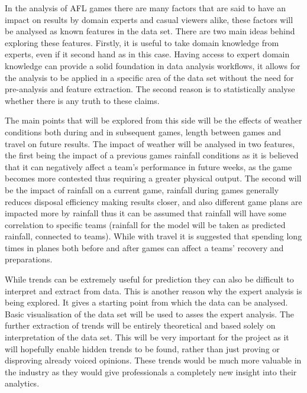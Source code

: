 \documentclass{imc-inf}
\begin{document}
	In the analysis of AFL games there are many factors that are said to have an impact on results by domain experts and casual viewers alike, these factors will be analysed as known features in the data set. There are two main ideas behind exploring these features. Firstly, it is useful to take domain knowledge from experts, even if it second hand as in this case. Having access to expert domain knowledge can provide a solid foundation in data analysis workflows, it allows for the analysis to be applied in a specific area of the data set without the need for pre-analysis and feature extraction. The second reason is to statistically analyse whether there is any truth to these claims. 
	
	The main points that will be explored from this side will be the effects of weather conditions both during and in subsequent games, length between games and travel on future results. The impact of weather will be analysed in two features, the first being the impact of a previous games rainfall conditions as it is believed that it can negatively affect a team’s performance in future weeks, as the game becomes more contested thus requiring a greater physical output. The second will be the impact of rainfall on a current game, rainfall during games generally reduces disposal efficiency making results closer, and also different game plans are impacted more by rainfall thus it can be assumed that rainfall will have some correlation to specific teams (rainfall for the model will be taken as predicted rainfall, connected to teams). While with travel it is suggested that spending long times in planes both before and after games can affect a teams’ recovery and preparations.
	\linebreak
	
	While trends can be extremely useful for prediction they can also be difficult to interpret and extract from data. This is another reason why the expert analysis is being explored. It gives a starting point from which the data can be analysed. Basic visualisation of the data set will be used to asses the expert analysis. The further extraction of trends will be entirely theoretical and based solely on interpretation of the data set. This will be very important for the project as it will hopefully enable hidden trends to be found, rather than just proving or disproving already voiced opinions. These trends would be much more valuable in the industry as they would give professionals a completely new insight into their analytics.
	
\end{document}
